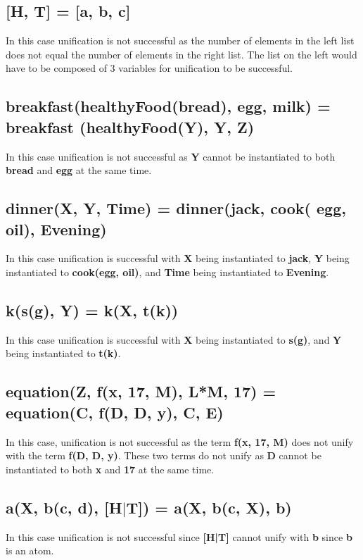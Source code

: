 \subsection{[H, T] = [a, b, c]}
In this case unification is not successful as the number of elements in the left list does not equal the number of elements in the right list. The list on the left would have to be composed of 3 variables for unification to be successful.

\subsection{breakfast(healthyFood(bread), egg, milk) = breakfast (healthyFood(Y), Y, Z)}
In this case unification is not successful as \textbf{Y} cannot be instantiated to both \textbf{bread} and \textbf{egg} at the same time.

\subsection{dinner(X, Y, Time) = dinner(jack, cook( egg, oil), Evening)}
In this case unification is successful with \textbf{X} being instantiated to \textbf{jack}, \textbf{Y} being instantiated to \textbf{cook(egg, oil)}, and \textbf{Time} being instantiated to \textbf{Evening}.

\subsection{k(s(g), Y) = k(X, t(k))}
In this case unification is successful with \textbf{X} being instantiated to \textbf{s(g)}, and  \textbf{Y} being instantiated to \textbf{t(k)}.

\subsection{equation(Z, f(x, 17, M), L*M, 17) = equation(C, f(D, D, y), C, E)}
In this case, unification is not successful as the term \textbf{f(x, 17, M)} does not unify with the term \textbf{f(D, D, y)}. These two terms do not unify as \textbf{D} cannot be instantiated to both \textbf{x} and \textbf{17} at the same time. 

\subsection{a(X, b(c, d), [H$\mid$T]) = a(X, b(c, X), b)}
In this case unification is not successful since \textbf{[H|T]} cannot unify with \textbf{b} since \textbf{b} is an atom.


